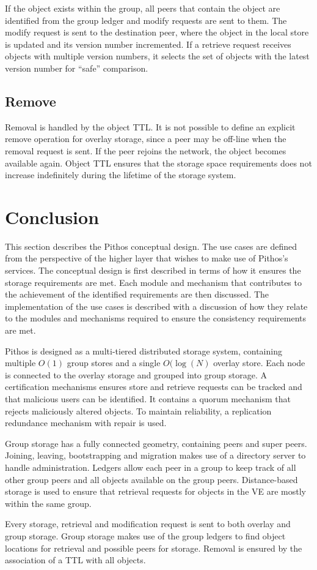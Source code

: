 If the object exists within the group, all peers that contain the object are identified from the group ledger and modify requests are sent to them. The modify request is sent to the destination peer, where the object in the local store is updated and its version number incremented. If a retrieve request receives objects with multiple version numbers, it selects the set of objects with the latest version number for ``safe'' comparison.

\subsection{Remove}

Removal is handled by the object TTL. It is not possible to define an explicit remove operation for overlay storage, since a peer may be off-line when the removal request is sent. If the peer rejoins the network, the object becomes available again. Object TTL ensures that the storage space requirements does not increase indefinitely during the lifetime of the storage system.

\section{Conclusion}

This section describes the Pithos conceptual design. The use cases are defined from the perspective of the higher layer that wishes to make use of Pithos's services. The conceptual design is first described in terms of how it ensures the storage requirements are met. Each module and mechanism that contributes to the achievement of the identified requirements are then discussed. The implementation of the use cases is described with a discussion of how they relate to the modules and mechanisms required to ensure the consistency requirements are met.

Pithos is designed as a multi-tiered distributed storage system, containing multiple $O(1)$ group stores and a single $O(\log(N)$ overlay store. Each node is connected to the overlay storage and grouped into group storage. A certification mechanisms ensures store and retrieve requests can be tracked and that malicious users can be identified. It contains a quorum mechanism that rejects maliciously altered objects. To maintain reliability, a replication redundance mechanism with repair is used.

Group storage has a fully connected geometry, containing peers and super peers. Joining, leaving, bootstrapping and migration makes use of a directory server to handle administration. Ledgers allow each peer in a group to keep track of all other group peers and all objects available on the group peers. Distance-based storage is used to ensure that retrieval requests for objects in the VE are mostly within the same group.

Every storage, retrieval and modification request is sent to both overlay and group storage. Group storage makes use of the group ledgers to find object locations for retrieval and possible peers for storage. Removal is ensured by the association of a TTL with all objects.
